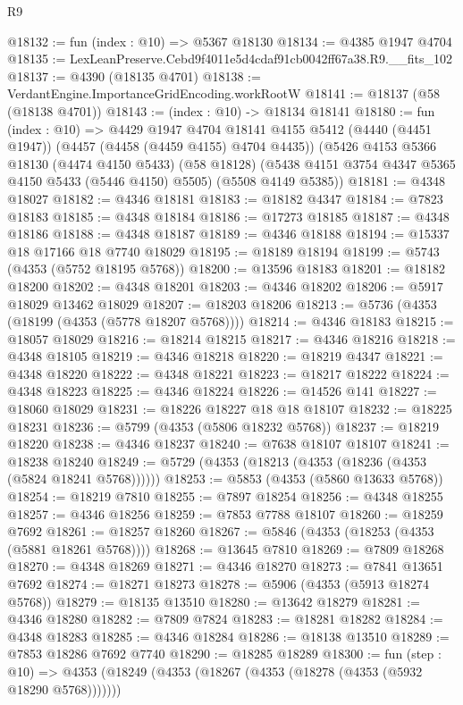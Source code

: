 \begin{lexlean}{R9}
\begin{coremodule}
@18132 := fun (index : @10) => @5367 @18130
@18134 := @4385 @1947 @4704
@18135 := LexLeanPreserve.Cebd9f4011e5d4cdaf91cb0042ff67a38.R9.__fits_102
@18137 := @4390 (@18135 @4701)
@18138 := VerdantEngine.ImportanceGridEncoding.workRootW
@18141 := @18137 (@58 (@18138 @4701))
@18143 := (index : @10) -> @18134 @18141
@18180 := fun (index : @10) =>
  @4429
    @1947
    @4704
    @18141
    @4155
    @5412
    (@4440 (@4451 @1947))
    (@4457 (@4458 (@4459 @4155) @4704 @4435))
    (@5426
      @4153
      @5366
      @18130
      (@4474 @4150 @5433)
      (@58 @18128)
      (@5438 @4151 @3754 @4347 @5365 @4150 @5433 (@5446 @4150) @5505)
      (@5508 @4149 @5385))
@18181 := @4348 @18027
@18182 := @4346 @18181
@18183 := @18182 @4347
@18184 := @7823 @18183
@18185 := @4348 @18184
@18186 := @17273 @18185
@18187 := @4348 @18186
@18188 := @4348 @18187
@18189 := @4346 @18188
@18194 := @15337 @18 @17166 @18 @7740 @18029
@18195 := @18189 @18194
@18199 := @5743 (@4353 (@5752 @18195 @5768))
@18200 := @13596 @18183
@18201 := @18182 @18200
@18202 := @4348 @18201
@18203 := @4346 @18202
@18206 := @5917 @18029 @13462 @18029
@18207 := @18203 @18206
@18213 := @5736 (@4353 (@18199 (@4353 (@5778 @18207 @5768))))
@18214 := @4346 @18183
@18215 := @18057 @18029
@18216 := @18214 @18215
@18217 := @4346 @18216
@18218 := @4348 @18105
@18219 := @4346 @18218
@18220 := @18219 @4347
@18221 := @4348 @18220
@18222 := @4348 @18221
@18223 := @18217 @18222
@18224 := @4348 @18223
@18225 := @4346 @18224
@18226 := @14526 @141
@18227 := @18060 @18029
@18231 := @18226 @18227 @18 @18 @18107
@18232 := @18225 @18231
@18236 := @5799 (@4353 (@5806 @18232 @5768))
@18237 := @18219 @18220
@18238 := @4346 @18237
@18240 := @7638 @18107 @18107
@18241 := @18238 @18240
@18249 := @5729 (@4353 (@18213 (@4353 (@18236 (@4353 (@5824 @18241 @5768))))))
@18253 := @5853 (@4353 (@5860 @13633 @5768))
@18254 := @18219 @7810
@18255 := @7897 @18254
@18256 := @4348 @18255
@18257 := @4346 @18256
@18259 := @7853 @7788 @18107
@18260 := @18259 @7692
@18261 := @18257 @18260
@18267 := @5846 (@4353 (@18253 (@4353 (@5881 @18261 @5768))))
@18268 := @13645 @7810
@18269 := @7809 @18268
@18270 := @4348 @18269
@18271 := @4346 @18270
@18273 := @7841 @13651 @7692
@18274 := @18271 @18273
@18278 := @5906 (@4353 (@5913 @18274 @5768))
@18279 := @18135 @13510
@18280 := @13642 @18279
@18281 := @4346 @18280
@18282 := @7809 @7824
@18283 := @18281 @18282
@18284 := @4348 @18283
@18285 := @4346 @18284
@18286 := @18138 @13510
@18289 := @7853 @18286 @7692 @7740
@18290 := @18285 @18289
@18300 := fun (step : @10) =>
  @4353 (@18249 (@4353 (@18267 (@4353 (@18278 (@4353 (@5932 @18290 @5768)))))))

\end{coremodule}
\end{lexlean}
